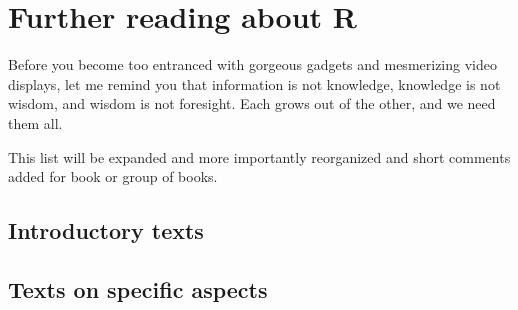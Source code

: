 \documentclass[krantz2]{krantz}\usepackage{knitr}%
\begin{document}












\chapter{Further reading about R}\label{chap:R:readings}

\begin{VF}
Before you become too entranced with gorgeous gadgets and mesmerizing video displays, let me remind you that information is not knowledge, knowledge is not wisdom, and wisdom is not foresight. Each grows out of the other, and we need them all.

\end{VF}


\begin{warningbox}
  This list will be expanded and more importantly reorganized and short comments added for book or group of books.
\end{warningbox}

\section{Introductory texts}

\cite{Allerhand2011,Dalgaard2008,Zuur2009,Teetor2011,Peng2017,Paradis2005,Peng2016}

\section{Texts on specific aspects}

\cite{Chang2013,Fox2002,Fox2010,Faraway2004,Faraway2006,Everitt2011,Wickham2017}
\end{document}
